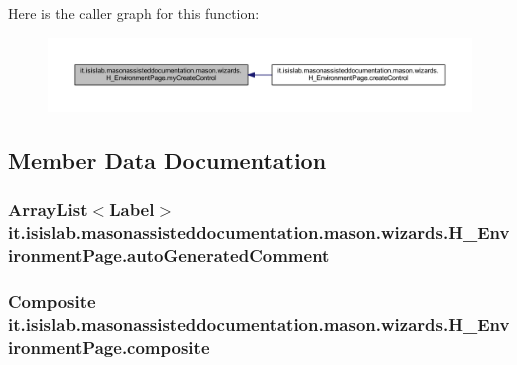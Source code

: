 Here is the caller graph for this function\-:
\nopagebreak
\begin{figure}[H]
\begin{center}
\leavevmode
\includegraphics[width=350pt]{classit_1_1isislab_1_1masonassisteddocumentation_1_1mason_1_1wizards_1_1_h___environment_page_a99746d862f89a4dad13af734914642cf_icgraph}
\end{center}
\end{figure}




\subsection{Member Data Documentation}
\hypertarget{classit_1_1isislab_1_1masonassisteddocumentation_1_1mason_1_1wizards_1_1_h___environment_page_a15a1e1e2224d71f7d9a10f962bbeee8f}{
\subsubsection[{auto\-Generated\-Comment}]{\setlength{\rightskip}{0pt plus 5cm}Array\-List$<$Label$>$ it.\-isislab.\-masonassisteddocumentation.\-mason.\-wizards.\-H\-\_\-\-Environment\-Page.\-auto\-Generated\-Comment\hspace{0.3cm}{\ttfamily [private]}}}\label{classit_1_1isislab_1_1masonassisteddocumentation_1_1mason_1_1wizards_1_1_h___environment_page_a15a1e1e2224d71f7d9a10f962bbeee8f}
\hypertarget{classit_1_1isislab_1_1masonassisteddocumentation_1_1mason_1_1wizards_1_1_h___environment_page_a08701d3343b8c6232831af0077e6cb37}{
\subsubsection[{composite}]{\setlength{\rightskip}{0pt plus 5cm}Composite it.\-isislab.\-masonassisteddocumentation.\-mason.\-wizards.\-H\-\_\-\-Environment\-Page.\-composite\hspace{0.3cm}{\ttfamily [private]}}}\label{classit_1_1isislab_1_1masonassisteddocumentation_1_1mason_1_1wizards_1_1_h___environment_page_a08701d3343b8c6232831af0077e6cb37}
